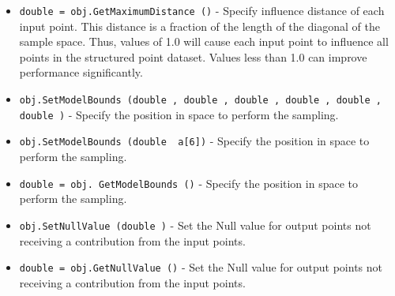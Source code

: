 \begin{itemize}
\item  \verb|double = obj.GetMaximumDistance ()| -  Specify influence distance of each input point. This distance is a 
 fraction of the length of the diagonal of the sample space. Thus, values 
 of 1.0 will cause each input point to influence all points in the 
 structured point dataset. Values less than 1.0 can improve performance
 significantly.

\item  \verb|obj.SetModelBounds (double , double , double , double , double , double )| -  Specify the position in space to perform the sampling.

\item  \verb|obj.SetModelBounds (double  a[6])| -  Specify the position in space to perform the sampling.

\item  \verb|double = obj. GetModelBounds ()| -  Specify the position in space to perform the sampling.

\item  \verb|obj.SetNullValue (double )| -  Set the Null value for output points not receiving a contribution from the
 input points.

\item  \verb|double = obj.GetNullValue ()| -  Set the Null value for output points not receiving a contribution from the
 input points.

\end{itemize}
